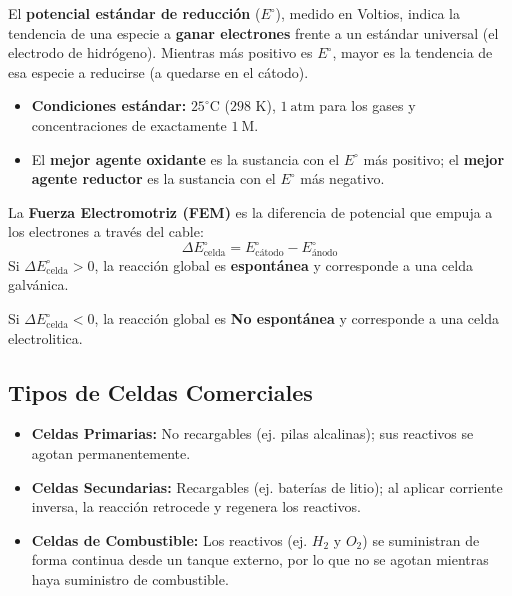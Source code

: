 \documentclass[letterpaper, 12pt, twoside]{article}
\newenvironment{formulabox}[1]{%
    \begin{tcolorbox}[colback=rojoSuave, colframe=rojoFuerte,
        title=\textbf{#1}, fonttitle=\bfseries]
}{%
    \end{tcolorbox}
}
\begin{document}
\begin{formulabox}{Potencial Estándar de Reducción ($E^\circ$) y FEM}
    El \textbf{potencial estándar de reducción} ($E^\circ$), medido en Voltios, indica la tendencia de una especie a \textbf{ganar electrones} frente a un estándar universal (el electrodo de hidrógeno). Mientras más positivo es $E^\circ$, mayor es la tendencia de esa especie a reducirse (a quedarse en el cátodo).
    \vspace{0.15cm}
    \begin{itemize}[leftmargin=15pt, topsep=2pt, itemsep=0pt]
        \item \textbf{Condiciones estándar:} $25^\circ\text{C}$ ($298$ K), $1\ \text{atm}$ para los gases y concentraciones de exactamente $1\ \text{M}$.
        \item El \textbf{mejor agente oxidante} es la sustancia con el $E^\circ$ más positivo; el \textbf{mejor agente reductor} es la sustancia con el $E^\circ$ más negativo.
    \end{itemize}
    \vspace{0.2cm}
    La \textbf{Fuerza Electromotriz (FEM)} es la diferencia de potencial que empuja a los electrones a través del cable:
    \[ \Delta E^\circ_{\text{celda}} = E^\circ_{\text{cátodo}} - E^\circ_{\text{ánodo}} \]
    Si $\Delta E^\circ_{\text{celda}} > 0$, la reacción global es \textbf{espontánea} y corresponde a una celda galvánica.
    
    \vspace{0.25cm}
    Si $\Delta E^\circ_{\text{celda}} < 0$, la reacción global es \textbf{No espontánea} y corresponde a una celda electrolitica.
\end{formulabox}

\subsection*{Tipos de Celdas Comerciales}
\begin{itemize}[leftmargin=15pt, topsep=2pt, itemsep=2pt]
    \item \textbf{Celdas Primarias:} No recargables (ej. pilas alcalinas); sus reactivos se agotan permanentemente.
    \item \textbf{Celdas Secundarias:} Recargables (ej. baterías de litio); al aplicar corriente inversa, la reacción retrocede y regenera los reactivos.
    \item \textbf{Celdas de Combustible:} Los reactivos (ej. $H_2$ y $O_2$) se suministran de forma continua desde un tanque externo, por lo que no se agotan mientras haya suministro de combustible.
    \vspace{0.5cm}
\end{itemize}
\end{document}
